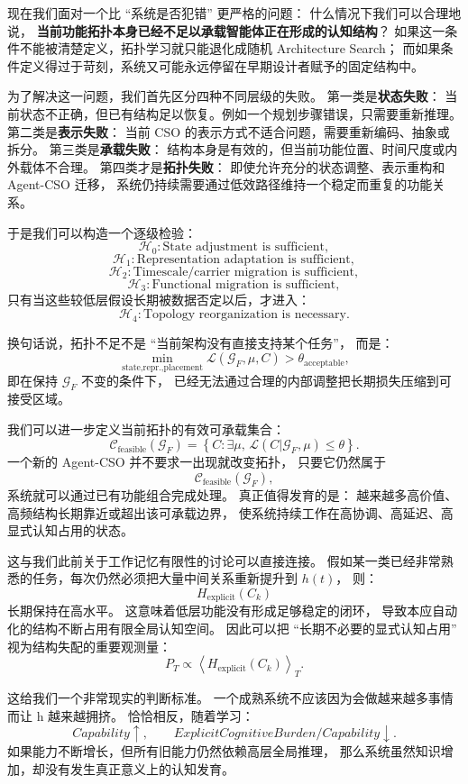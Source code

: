 现在我们面对一个比 ``系统是否犯错'' 更严格的问题：
什么情况下我们可以合理地说，
\textbf{当前功能拓扑本身已经不足以承载智能体正在形成的认知结构}？
如果这一条件不能被清楚定义，拓扑学习就只能退化成随机 Architecture Search；
而如果条件定义得过于苛刻，系统又可能永远停留在早期设计者赋予的固定结构中。

为了解决这一问题，我们首先区分四种不同层级的失败。
第一类是\textbf{状态失败}：
当前状态不正确，但已有结构足以恢复。例如一个规划步骤错误，只需要重新推理。
第二类是\textbf{表示失败}：
当前 CSO 的表示方式不适合问题，需要重新编码、抽象或拆分。
第三类是\textbf{承载失败}：
结构本身是有效的，但当前功能位置、时间尺度或内外载体不合理。
第四类才是\textbf{拓扑失败}：
即使允许充分的状态调整、表示重构和 Agent-CSO 迁移，
系统仍持续需要通过低效路径维持一个稳定而重复的功能关系。

于是我们可以构造一个逐级检验：
\[
\mathcal H_0:
\text{State adjustment is sufficient},
\]
\[
\mathcal H_1:
\text{Representation adaptation is sufficient},
\]
\[
\mathcal H_2:
\text{Timescale/carrier migration is sufficient},
\]
\[
\mathcal H_3:
\text{Functional migration is sufficient},
\]
只有当这些较低层假设长期被数据否定以后，才进入：
\[
\mathcal H_4:
\text{Topology reorganization is necessary}.
\]

换句话说，拓扑不足不是 ``当前架构没有直接支持某个任务''，
而是：
\[
\boxed{
\min_{\text{state,repr.,placement}}
\mathcal L
\left(
\mathcal G_F,
\mu,
C
\right)
>
\theta_{\mathrm{acceptable}},
}
\]
即在保持 $\mathcal G_F$ 不变的条件下，
已经无法通过合理的内部调整把长期损失压缩到可接受区域。

我们可以进一步定义当前拓扑的有效可承载集合：
\[
\mathcal C_{\mathrm{feasible}}
(\mathcal G_F)
=
\left\{
C:
\exists\mu,\,
\mathcal L(C|\mathcal G_F,\mu)
\leq\theta
\right\}.
\]
一个新的 Agent-CSO 并不要求一出现就改变拓扑，
只要它仍然属于
\[
\mathcal C_{\mathrm{feasible}}(\mathcal G_F),
\]
系统就可以通过已有功能组合完成处理。
真正值得发育的是：
越来越多高价值、高频结构长期靠近或超出该可承载边界，
使系统持续工作在高协调、高延迟、高显式认知占用的状态。

这与我们此前关于工作记忆有限性的讨论可以直接连接。
假如某一类已经非常熟悉的任务，每次仍然必须把大量中间关系重新提升到 $h(t)$，
则：
\[
H_{\mathrm{explicit}}(C_k)
\]
长期保持在高水平。
这意味着低层功能没有形成足够稳定的闭环，
导致本应自动化的结构不断占用有限全局认知空间。
因此可以把 ``长期不必要的显式认知占用'' 视为结构失配的重要观测量：
\[
P_T
\propto
\left\langle
H_{\mathrm{explicit}}(C_k)
\right\rangle_T.
\]

这给我们一个非常现实的判断标准。
一个成熟系统不应该因为会做越来越多事情而让 h 越来越拥挤。
恰恰相反，随着学习：
\[
Capability\uparrow,
\qquad
ExplicitCognitiveBurden/Capability\downarrow.
\]
如果能力不断增长，但所有旧能力仍然依赖高层全局推理，
那么系统虽然知识增加，却没有发生真正意义上的认知发育。


